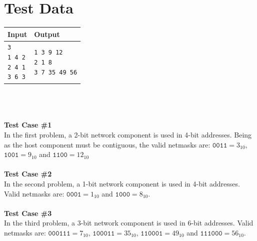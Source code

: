 \documentclass[11pt]{article}
\begin{document}
\section{Test Data}
\begin{tabularx}{\textwidth}{|X|X|}
	\hline
	Input & Output \\ \hline
	\parbox[t]{5cm}{
	\texttt{3\\
			1 4 2\\
			2 4 1\\
			3 6 3\\
	}} &
	\parbox[t]{5cm}{
	\texttt{1 3 9 12\\
			2 1 8\\
			3 7 35 49 56\\
			}}\\
	\hline
\end{tabularx}
\\\\\\
\textbf{Test Case \#1}\\
In the first problem, a 2-bit network component is used in 4-bit addresses. Being as the host
component must be contiguous, the valid netmasks are: $\texttt{0011} = 3_{10}$, $\texttt{1001} = 9_{10}$ and $\texttt{1100} = 12_{10}$
\\\\
\textbf{Test Case \#2}\\
In the second problem, a 1-bit network component is used in 4-bit addresses. Valid netmasks are: $\texttt{0001} = 1_{10}$ and $\texttt{1000} = 8_{10}$.
\\\\
\textbf{Test Case \#3}\\
In the third problem, a 3-bit network component is used in 6-bit addresses. Valid netmasks are: $\texttt{000111} = 7_{10}$, $\texttt{100011} = 35_{10}$, $\texttt{110001} = 49_{10}$ and $\texttt{111000} = 56_{10}$.
\end{document}
